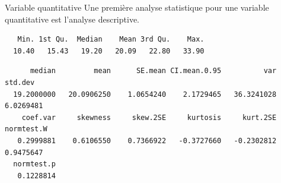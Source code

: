 \documentclass[
  8pt,
  ignorenonframetext,
]{beamer}
\newenvironment{Shaded}{\begin{snugshade}}{\end{snugshade}}
\newcommand{\AttributeTok}[1]{\textcolor[rgb]{0.77,0.63,0.00}{#1}}
\newcommand{\FunctionTok}[1]{\textcolor[rgb]{0.00,0.00,0.00}{#1}}
\newcommand{\NormalTok}[1]{#1}
\newcommand{\SpecialCharTok}[1]{\textcolor[rgb]{0.00,0.00,0.00}{#1}}
\begin{document}
\begin{frame}[fragile]{Variable quantitative}
\protect\hypertarget{variable-quantitative-1}{}
Une première analyse statistique pour une variable quantitative est
l'analyse descriptive.

\begin{Shaded}
\end{Shaded}

\begin{verbatim}
   Min. 1st Qu.  Median    Mean 3rd Qu.    Max. 
  10.40   15.43   19.20   20.09   22.80   33.90 
\end{verbatim}

\begin{Shaded}
\end{Shaded}

\begin{verbatim}
      median         mean      SE.mean CI.mean.0.95          var      std.dev 
  19.2000000   20.0906250    1.0654240    2.1729465   36.3241028    6.0269481 
    coef.var     skewness     skew.2SE     kurtosis     kurt.2SE   normtest.W 
   0.2999881    0.6106550    0.7366922   -0.3727660   -0.2302812    0.9475647 
  normtest.p 
   0.1228814 
\end{verbatim}

\vspace*{2cm}
\end{frame}
\end{document}
